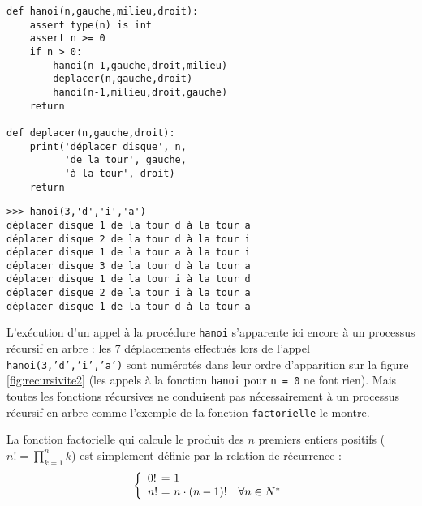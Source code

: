 \noindent\mbox{}\hspace*{1cm}
\begin{py}{6cm}
\begin{verbatim}
def hanoi(n,gauche,milieu,droit):
    assert type(n) is int
    assert n >= 0
    if n > 0:
        hanoi(n-1,gauche,droit,milieu)
        deplacer(n,gauche,droit)
        hanoi(n-1,milieu,droit,gauche)
    return

def deplacer(n,gauche,droit):
    print('déplacer disque', n,
          'de la tour', gauche, 
          'à la tour', droit)
    return
\end{verbatim}
\end{py}
\hfill
\begin{py}{6cm}
\begin{verbatim}
>>> hanoi(3,'d','i','a')
déplacer disque 1 de la tour d à la tour a
déplacer disque 2 de la tour d à la tour i
déplacer disque 1 de la tour a à la tour i
déplacer disque 3 de la tour d à la tour a
déplacer disque 1 de la tour i à la tour d
déplacer disque 2 de la tour i à la tour a
déplacer disque 1 de la tour d à la tour a
\end{verbatim}
\end{py}
\hspace*{1cm}\mbox{}\vspace*{2mm}

\noindent L'exécution d'un appel à la procédure {\tt hanoi} s'apparente ici encore
à un processus récursif en arbre : les 7 déplacements effectués lors
de l'appel {\tt hanoi(3,'d','i','a')} sont numérotés dans leur ordre d'apparition
sur la figure \ref{fig:recursivite2} (les appels à la fonction {\tt hanoi}
pour {\tt n = 0} ne font rien). Mais toutes les fonctions récursives ne
conduisent pas nécessairement à un processus récursif en arbre 
comme l'exemple de la fonction {\tt factorielle} le montre.

\begin{ex}\label{ex:factorielle}
La fonction factorielle qui calcule le produit des 
$n$ premiers entiers positifs ($\displaystyle n! = \prod_{k=1}^n k$) 
est simplement définie par la relation de
récurrence :
$$\left\{\begin{array}{l@{\ =\ }ll}
0! & 1 & \\
n! & n\cdot (n-1)! & \forall n \in N^*
\end{array}\right.$$
\end{ex}

